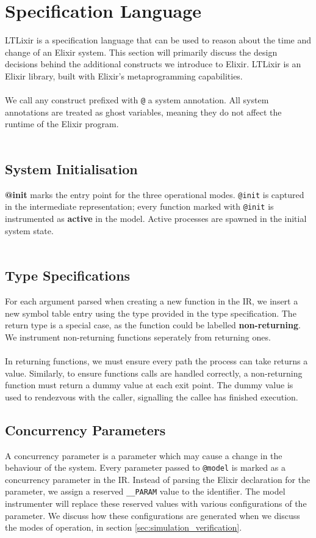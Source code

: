 \section{Specification Language} \label{sec:specification_language}
LTLixir is a specification language that can be used to reason about the time and change of an Elixir system. This section will primarily discuss the design decisions behind the additional constructs we introduce to Elixir. LTLixir is an Elixir library, built with Elixir's metaprogramming capabilities.
\\ \\
We call any construct prefixed with \texttt{@} a system annotation. All system annotations are treated as ghost variables, meaning they do not affect the runtime of the Elixir program.
\\ \\
\subsection{System Initialisation}
\textbf{@init} marks the entry point for the three operational modes. \texttt{@init} is captured in the intermediate representation; every function marked with \texttt{@init} is instrumented as \textbf{active} in the model. Active processes are spawned in the initial system state.
\\ \\
\subsection{Type Specifications}
For each argument parsed when creating a new function in the IR, we insert a new symbol table entry using the type provided in the type specification. The return type is a special case, as the function could be labelled \textbf{non-returning}. We instrument non-returning functions seperately from returning ones.
\\ \\
In returning functions, we must ensure every path the process can take returns a value. Similarly, to ensure functions calls are handled correctly, a non-returning function must return a dummy value at each exit point. The dummy value is used to rendezvous with the caller, signalling the callee has finished execution.
\subsection{Concurrency Parameters}
A concurrency parameter is a parameter which may cause a change in the behaviour of the system. Every parameter passed to \texttt{@model} is marked as a concurrency parameter in the IR. Instead of parsing the Elixir declaration for the parameter, we assign a reserved \texttt{\_\_PARAM} value to the identifier. The model instrumenter will replace these reserved values with various configurations of the parameter. We discuss how these configurations are generated when we discuss the modes of operation, in section \ref{sec:simulation_verification}.
\\ \\


